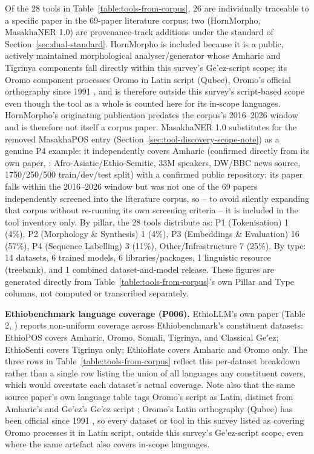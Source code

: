 \documentclass[sn-mathphys-num]{sn-jnl}
\theoremstyle{thmstyleone}
\theoremstyle{thmstyletwo}
\theoremstyle{thmstylethree}
\begin{document}
\noindent Of the 28 tools in Table~\ref{table:tools-from-corpus}, 26 are individually traceable to a specific paper in the 69-paper literature corpus; two (HornMorpho, MasakhaNER 1.0) are provenance-track additions under the standard of Section~\ref{sec:dual-standard}. HornMorpho is included because it is a public, actively maintained morphological analyser/generator whose Amharic and Tigrinya components fall directly within this survey's Ge'ez-script scope; its Oromo component processes Oromo in Latin script (Qubee), Oromo's official orthography since 1991 \citep{tegegne_qubee_2016}, and is therefore outside this survey's script-based scope even though the tool as a whole is counted here for its in-scope languages. HornMorpho's originating publication \citep{gasser_hornmorpho_2011} predates the corpus's 2016--2026 window and is therefore not itself a corpus paper. MasakhaNER 1.0 substitutes for the removed MasakhaPOS entry (Section~\ref{sec:tool-discovery-scope-note}) as a genuine P4 example: it independently covers Amharic (confirmed directly from its own paper, \citealp{adelani_masakhaner_2021}: Afro-Asiatic/Ethio-Semitic, 33M speakers, DW/BBC news source, 1750/250/500 train/dev/test split) with a confirmed public repository; its paper falls within the 2016--2026 window but was not one of the 69 papers independently screened into the literature corpus, so -- to avoid silently expanding that corpus without re-running its own screening criteria -- it is included in the tool inventory only. By pillar, the 28 tools distribute as: P1 (Tokenisation) 1 (4\%), P2 (Morphology \& Synthesis) 1 (4\%), P3 (Embeddings \& Evaluation) 16 (57\%), P4 (Sequence Labelling) 3 (11\%), Other/Infrastructure 7 (25\%). By type: 14 datasets, 6 trained models, 6 libraries/packages, 1 linguistic resource (treebank), and 1 combined dataset-and-model release. These figures are generated directly from Table~\ref{table:tools-from-corpus}'s own Pillar and Type columns, not computed or transcribed separately.

\noindent\textbf{Ethiobenchmark language coverage (P006).} EthioLLM's own paper (Table 2, \citealp{tonja_ethiollm_2024}) reports non-uniform coverage across Ethiobenchmark's constituent datasets: EthioPOS covers Amharic, Oromo, Somali, Tigrinya, and Classical Ge'ez; EthioSenti covers Tigrinya only; EthioHate covers Amharic and Oromo only. The three rows in Table~\ref{table:tools-from-corpus} reflect this per-dataset breakdown rather than a single row listing the union of all languages any constituent covers, which would overstate each dataset's actual coverage. Note also that the same source paper's own language table tags Oromo's script as Latin, distinct from Amharic's and Ge'ez's Ge'ez script \citep{tonja_ethiollm_2024}; Oromo's Latin orthography (Qubee) has been official since 1991 \citep{tegegne_qubee_2016}, so every dataset or tool in this survey listed as covering Oromo processes it in Latin script, outside this survey's Ge'ez-script scope, even where the same artefact also covers in-scope languages.
\end{document}
